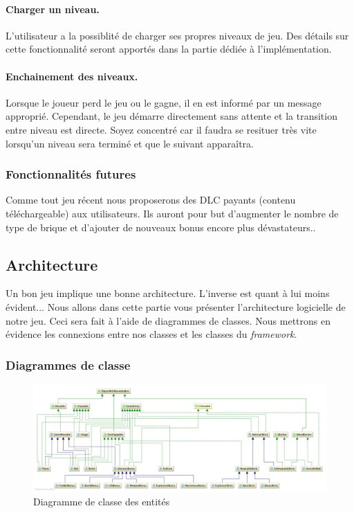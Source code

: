 \documentclass[a4paper,10pt]{article}
\begin{document}
		\paragraph{Charger un niveau.} L'utilisateur a la possiblité de charger ses propres niveaux de jeu. Des détails sur
		cette fonctionnalité seront apportés dans la partie dédiée à l'implémentation.

        \paragraph{Enchainement des niveaux. } Lorsque le joueur perd le jeu ou le gagne, il en est informé par un message approprié. Cependant, le jeu démarre
        directement sans attente et la transition entre niveau est directe. Soyez concentré car il faudra
        se resituer très vite lorsqu'un niveau sera terminé et que le suivant apparaîtra.

	\subsubsection{Fonctionnalités futures}
		Comme tout jeu récent nous proposerons des DLC payants (contenu téléchargeable) aux utilisateurs. Ils auront pour but
		d'augmenter le nombre de type de brique et d'ajouter de nouveaux bonus encore plus dévastateurs..

\subsection{Architecture}
    Un bon jeu implique une bonne architecture. L'inverse est quant à lui moins évident...
	Nous allons dans cette partie vous présenter l'architecture logicielle de notre jeu. Ceci sera fait à l'aide de
	diagrammes de classes.
	Nous mettrons en évidence les connexions entre nos classes et les classes du \textit{framework}.

	\subsubsection{Diagrammes de classe}

		\FloatBarrier
		\begin{figure}[!h]
    		\begin{center}
	  	  	\includegraphics[scale=0.17]{images/whiteEntityDiagram.jpg}
          	\caption{Diagramme de classe des entités}
    		\end{center}
		\end{figure}
		\FloatBarrier
\end{document}
